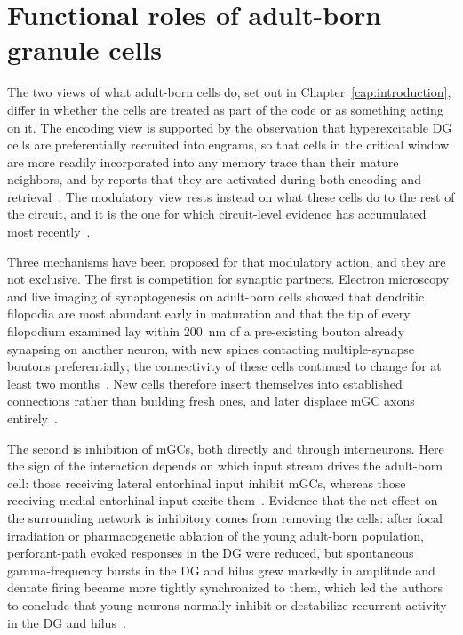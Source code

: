\section{Functional roles of adult-born granule cells}

The two views of what adult-born cells do, set out in Chapter~\ref{cap:introduction}, differ in whether the cells are treated as
part of the code or as something acting on it. The encoding view is supported by the observation that hyperexcitable DG cells are
preferentially recruited into engrams, so that cells in the critical window are more readily incorporated into any memory trace
than their mature neighbors, and by reports that they are activated during both encoding and
retrieval~\parencite{piattiNeurogenesis2013, folszAdultborn2023}. The modulatory view rests instead on what these cells do to the
rest of the circuit, and it is the one for which circuit-level evidence has accumulated most
recently~\parencite{aimoneComputational2016, mchughAdultborn2022, folszAdultborn2023}.

Three mechanisms have been proposed for that modulatory action, and they are not exclusive. The first is competition for synaptic
partners. Electron microscopy and live imaging of synaptogenesis on adult-born cells showed that dendritic filopodia are most
abundant early in maturation and that the tip of every filopodium examined lay within \SI{200}{\nano\metre} of a pre-existing bouton
already synapsing on another neuron, with new spines contacting multiple-synapse boutons preferentially; the connectivity of these
cells continued to change for at least two months~\parencite{toniSynapse2007}. New cells therefore insert themselves into
established connections rather than building fresh ones, and later displace mGC axons
entirely~\parencite{toniSynapse2007, folszAdultborn2023}.

The second is inhibition of mGCs, both directly and through interneurons. Here the sign of the interaction depends on which input
stream drives the adult-born cell: those receiving lateral entorhinal input inhibit mGCs, whereas those receiving medial
entorhinal input excite them~\parencite{lunaAdultborn2019}. Evidence that the net effect on the surrounding network is inhibitory
comes from removing the cells: after focal irradiation or pharmacogenetic ablation of the young adult-born population,
perforant-path evoked responses in the DG were reduced, but spontaneous gamma-frequency bursts in the DG and hilus grew markedly
in amplitude and dentate firing became more tightly synchronized to them, which led the authors to conclude that young neurons
normally inhibit or destabilize recurrent activity in the DG and hilus~\parencite{lacefieldEffects2012}.

